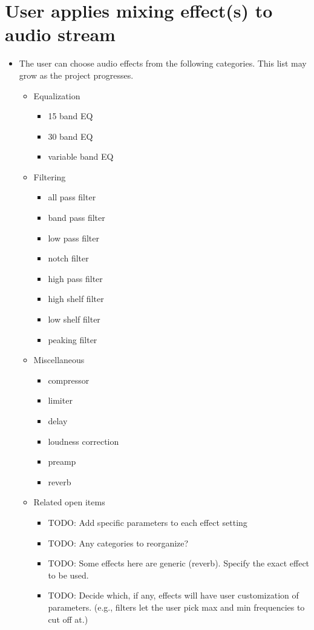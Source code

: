 \section{User applies mixing effect(s) to audio stream}

\begin{itemize}

	\item The user can choose audio effects from the following categories. This list may grow as the project progresses.
	\begin{itemize}
		\item Equalization
		\begin{itemize}
			\item 15 band EQ
			\item 30 band EQ
			\item variable band EQ
		\end{itemize}

		\item Filtering
		\begin{itemize}
			\item all pass filter
			\item band pass filter
			\item low pass filter
			\item notch filter
			\item high pass filter
			\item high shelf filter
			\item low shelf filter
			\item peaking filter
		\end{itemize}

		\item Miscellaneous
		\begin{itemize}
			\item compressor
			\item limiter
			\item delay
			\item loudness correction
			\item preamp
			\item reverb
		\end{itemize}

		\item Related open items
		\begin{itemize}
			\item TODO: Add specific parameters to each effect setting
			\item TODO: Any categories to reorganize?
			\item TODO: Some effects here are generic (reverb). Specify the exact effect to be used.
			\item TODO: Decide which, if any, effects will have user customization of parameters. (e.g., filters let the user pick max and min frequencies to cut off at.)
		\end{itemize}
	\end{itemize}





\end{itemize}